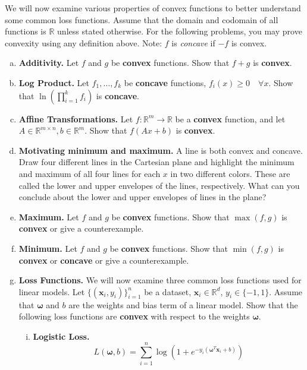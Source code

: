 \documentclass{exam}
\def\R{\mathbb{R}}
\begin{document}
\noindent We will now examine various properties of convex functions to better understand some common loss functions.
Assume that the domain and codomain of all functions is $\R$ unless stated otherwise. For the following problems, you may prove convexity using any definition above. Note: $f$ is \textit{concave} if $-f$ is convex.
\begin{enumerate}[(a)]
    \item \textbf{Additivity.}
    Let $f$ and $g$ be \textbf{convex} functions. Show that $f+g$ is \textbf{convex}.

    \item \textbf{Log Product.} Let $f_1, \ldots, f_k$ be \textbf{concave} functions, $f_i(x) \geq 0 \quad \forall x$.
    Show that $\ln \left(\prod_{i=1}^k f_i \right)$ is \textbf{concave}.

    \item \textbf{Affine Transformations.} Let $f: \R^m \to \R$ be a \textbf{convex} function, and let $A \in \R^{m \times n}, b \in \R^m$. Show that $f(Ax + b)$ is \textbf{convex}.

    \item \textbf{Motivating minimum and maximum.} A line is both convex and concave. Draw four different lines in the Cartesian plane and highlight the minimum and maximum of all four lines for each $x$ in two different colors. These are called the lower and upper envelopes of the lines, respectively. What can you conclude about the lower and upper envelopes of lines in the plane?

    \item \textbf{Maximum.} Let $f$ and $g$ be \textbf{convex} functions. Show that $\max(f, g)$ is \textbf{convex} or give a counterexample.

    \item \textbf{Minimum.} Let $f$ and $g$ be \textbf{convex} functions. Show that $\min(f, g)$ is \textbf{convex} or \textbf{concave} or give a counterexample.

    \item \textbf{Loss Functions.} We will now examine three common loss functions used for linear models. 
    Let $\{(\bm{x}_i, y_i)\}_{i=1}^n$ be a dataset, $\bm{x}_i \in \R^d$, $y_i\in \{-1, 1\}$.
    Assume that $\bm{\omega}$ and $b$ are the weights and bias term of a linear model.
    Show that the following loss functions are \textbf{convex} with respect to the weights $\bm{\omega}$.
    \begin{enumerate}[i.]
        \item \textbf{Logistic Loss.} 
        \begin{equation*}
            L(\bm{\omega}, b) = \sum_{i=1}^n \log(1+e^{-y_i(\bm{\omega}^T \bm{x}_i + b)})
        \end{equation*}
         

\end{enumerate}
\end{enumerate}
\end{document}
